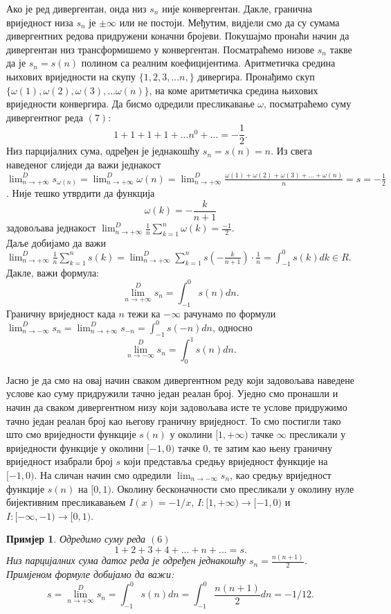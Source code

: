 \documentclass[12pt]{article}
\newtheorem{example}{Примјер}
\begin{document}
Ако је ред дивергентан, онда низ $s_n$ није конвергентан. Дакле, гранична вриједност низа $s_n$ је $\pm\infty$ или не постоји. Међутим, видјели смо да су сумама дивергентних редова придружени коначни бројеви. Покушајмо пронаћи начин да дивергентан низ трансформишемо у конвергентан. Посматраћемо низове $s_n$ такве да је $s_n=s(n)$ полином са реалним коефицијентима. Аритметичка средина њихових вриједности на скупу $\{1,2,3,...n,\}$ дивергира. Пронађимо скуп $\{\omega(1),\omega(2),\omega(3),...\omega(n)\}$, на коме аритметичка средина њихових вриједности конвергира. Да бисмо одредили пресликавање $\omega$, посматраћемо суму дивергентног реда $(7)$: $$1+1+1+1+...n^0+...=-\frac{1}{2}.$$ Низ парцијалних сума, одређен је једнакошћу $s_n=s(n)=n$. Из свега наведеног слиједи да важи једнакост $\lim_{n\to+\infty}^D s_{\omega(n)}=\lim_{n\to+\infty}^D \omega(n)=\lim_{n\to+\infty}^D \frac{\omega(1)+\omega(2)+\omega(3)+...+\omega(n)}{n}=s=-\frac{1}{2}$. Није тешко утврдити да функција $$\omega(k)=-\frac{k}{n+1}$$ задовољава једнакост $\lim_{n\to+\infty}^D \frac{1}{n}\sum_{k=1}^n \omega (k)=\frac{-1}{2}$.\\ 
Даље добијамо да важи $\lim_{n\to+\infty}^D \frac{1}{n}\sum_{k=1}^n s (k)=\lim_{n\to+\infty}^D \sum_{k=1}^n s(-\frac{k}{n+1})\cdot \frac{1}{n}=\int_{-1}^{0}s(k)dk\in R$. Дакле, важи формула: $$\lim_{n\to+\infty}^D s_n=\int_{-1}^{0}s(n)dn.$$ Граничну вриједност када  $n$ тежи ка $-\infty$ рачунамо по формули $\lim_{n\to -\infty}^D s_n=\lim_{n\to +\infty}^D s_{-n}=\int_{-1}^{0}s(-n)dn$, односно $$\lim_{n\to -\infty}^D s_n=\int_{0}^{1}s(n)dn.$$ 

Јасно је да смо на овај начин сваком дивергентном реду који задовољава наведене услове као суму придружили тачно један реалан број. Уједно смо пронашли и начин да сваком дивергентном низу који задовољава исте те услове придружимо тачно један реалан број као његову граничну вриједност. То смо постигли тако што смо вриједности функције $s(n)$ у околини $[1,+\infty)$ тачке $\infty$ пресликали у вриједности функције у околини $[-1,0)$ тачке $0$, те затим као њену граничну вриједност изабрали број $s$ који представља средњу вриједност функције на $[-1,0)$. На сличан начин смо одредили $\lim_{n\to-\infty}s_n$, као средњу вриједност функције $s(n)$ на $[0,1)$. Околину бесконачности смо пресликали у околину нуле бијективним пресликавањем $I(x)=-1/x$, $I:[1,+\infty)\rightarrow[-1,0)$ и $I:[-\infty,-1)\rightarrow[0,1)$.

\begin{example}
Одредимо суму реда $(6)$ $$1+2+3+4+...+n+...=s.$$ Низ парцијалних сума датог реда је одређен једнакошћу $s_n=\frac{n(n+1)}{2}$. Примјеном формуле добијамо да важи:\\ $$s=\lim_{n\to+\infty}^D s_n=\int_{-1}^{0}s(n)dn=\int_{-1}^{0}\frac{n(n+1)}{2}dn=-1/12.$$
\end{example}
\end{document}
